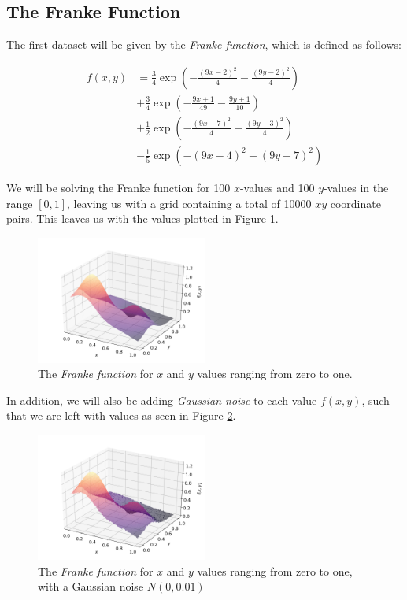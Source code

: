 \documentclass[a4paper,10pt,english]{article}
\begin{document}
\begin{multicols*}{2}
\subsection*{The Franke Function}

The first dataset will be given by the \textit{Franke function}, which is defined as follows:

\begin{align*}
f(x,y) &= \frac{3}{4} \exp \left( -\frac{(9x-2)^2}{4} -\frac{(9y-2)^2}{4} \right) \\ &+ \frac{3}{4} \exp \left( -\frac{9x+1}{49} -\frac{9y+1}{10} \right) \\ &+ \frac{1}{2} \exp \left( -\frac{(9x-7)^2}{4} -\frac{(9y-3)^2}{4} \right) \\ &- \frac{1}{5} \exp \left( -(9x-4)^2 - (9y-7)^2 \right)
\end{align*}

We will be solving the Franke function for 100 $x$-values and 100 $y$-values in the range $[0,1]$, leaving us with a grid containing a total of 10000 $xy$ coordinate pairs.  This leaves us with the values plotted in Figure \ref{fig_Franke}.

\begin{figure}[H]
	\centering
	\includegraphics[width = 0.5\textwidth, center]{../franke_output/Franke.png}
	\caption{The \textit{Franke function} for $x$ and $y$ values ranging from zero to one. \label{fig_Franke}}
\end{figure}

In addition, we will also be adding \textit{Gaussian noise} to each value $f(x,y)$, such that we are left with values as seen in Figure \ref{fig_Franke_noise}.

\begin{figure}[H]
	\centering
	\includegraphics[width = 0.5\textwidth, center]{../franke_output/Franke_noise.png}
	\caption{The \textit{Franke function} for $x$ and $y$ values ranging from zero to one, with a Gaussian noise $N(0,0.01)$\label{fig_Franke_noise}}
\end{figure}


\end{multicols*}
\end{document}
